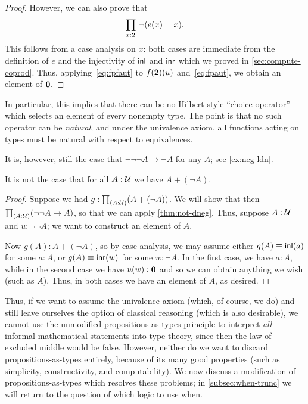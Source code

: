 \begin{proof}
  However, we can also prove that
  \begin{equation}
    \prd{x:\bool} \neg(e(x)=x).\label{eq:fpfaut}
  \end{equation}
  This follows from a case analysis on $x$: both cases are immediate from the definition of $e$ and the injectivity of ${\mathsf{inl}}$ and ${\mathsf{inr}}$ which we proved in \autoref{sec:compute-coprod}.
  Thus, applying~\eqref{eq:fpfaut} to $f(\mathbf{2})(u)$ and~\eqref{eq:fpaut}, we obtain an element of $\mathbf{0}$.
\end{proof}

\begin{rmk}
  In particular, this implies that there can be no Hilbert-style ``choice operator'' which selects an element of every nonempty type.
  The point is that no such operator can be \emph{natural}, and under the univalence axiom, all functions acting on types must be natural with respect to equivalences.
\end{rmk}

\begin{rmk}
  It is, however, still the case that $\neg\neg\neg A \to \neg A$ for any $A$; see \autoref{ex:neg-ldn}.
\end{rmk}

\begin{cor}\label{thm:not-lem}
  It is not the case that for all $A:\mathcal{U}$ we have $A+(\neg A)$.
\end{cor}
\begin{proof}
  Suppose we had $g:\prd{A:\UU} (A+(\neg A))$.
  We will show that then $\prd{A:\UU} (\neg\neg A \to A)$, so that we can apply \autoref{thm:not-dneg}.
  Thus, suppose $A:\mathcal{U}$ and $u:\neg\neg A$; we want to construct an element of $A$.

  Now $g(A):A+(\neg A)$, so by case analysis, we may assume either $g(A)\equiv {\mathsf{inl}}(a)$ for some $a:A$, or $g(A)\equiv {\mathsf{inr}}(w)$ for some $w:\neg A$.
  In the first case, we have $a:A$, while in the second case we have $u(w):\mathbf{0}$ and so we can obtain anything we wish (such as $A$).
  Thus, in both cases we have an element of $A$, as desired.
\end{proof}

Thus, if we want to assume the univalence axiom (which, of course, we do) and still leave ourselves the option of classical reasoning (which is also desirable), we cannot use the unmodified propositions-as-types principle to interpret \emph{all} informal mathematical statements into type theory, since then the law of excluded middle would be false.
However, neither do we want to discard propositions-as-types entirely, because of its many good properties (such as simplicity, constructivity, and computability).
We now discuss a modification of propositions-as-types which resolves these problems; in \autoref{subsec:when-trunc} we will return to the question of which logic to use when.


